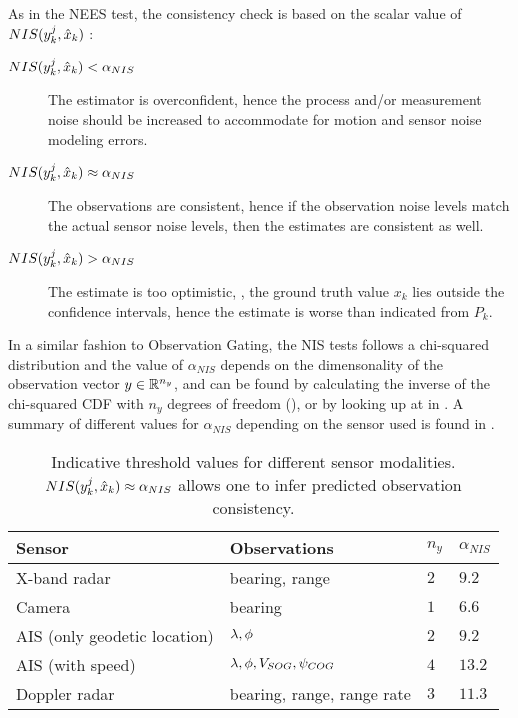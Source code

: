 As in the NEES test, the consistency check is based on the scalar value of $NIS({{y}}^j_k, \hat{x}_k)$ :
\begin{description}
	\item[$NIS({{y}}^j_k, \hat{x}_k) < \alpha_{NIS}$] The estimator is overconfident, hence the process and/or measurement noise should be increased to accommodate for motion and sensor noise modeling errors.
	\item[$NIS({{y}}^j_k, \hat{x}_k) \approx \alpha_{NIS} $] The observations are consistent, hence if the observation noise levels match the actual sensor noise levels, then the estimates are consistent as well.
	\item[$NIS({{y}}^j_k, \hat{x}_k) > \alpha_{NIS}$] The estimate is too optimistic, \ie, the ground truth value $x_k$ lies outside the confidence intervals, hence the estimate is worse than indicated from $P_k$.
\end{description}
In a similar fashion to Observation Gating, the NIS tests follows a chi-squared distribution and the value of $\alpha_{NIS}$ depends on the dimensonality of the observation vector ${{y}} \in {\mathbb{R}}^{n_y}$, and can be found by calculating the inverse of the chi-squared CDF with $n_y$ degrees of freedom (), or by looking up at  in .  A summary of different values for $\alpha_{NIS}$ depending on the sensor used is found in .


\begin{table}[H]
	\centering
	\caption{Indicative threshold values for different sensor modalities. $NIS({{y}}^j_k, \hat{x}_k) \approx \alpha_{NIS}$ allows one to infer predicted observation consistency.}
	\label{tab:alphaNIS}
	\begin{tabular}{llll}
		\hline
		Sensor                       & Observations               & $n_y$ & $\alpha_{NIS}$ \\ \hline
		X-band radar                 & bearing, range             & $ 2 $  & $9.2$              \\
		Camera                       & bearing                    & $ 1 $     & $6.6$              \\
		AIS (only geodetic location) & ${\lambda}, {\phi}$                    & $ 2     $ & $ 9.2 $              \\
		AIS (with speed)             & ${\lambda}, {\phi}, {V}_{SOG},{\psi}_{COG}$                  & $ 4  $    & $ 13.2 $       \\
		Doppler radar                & bearing, range, range rate & $ 3  $    & $ 11.3  $             \\ \hline
	\end{tabular}
\end{table}


